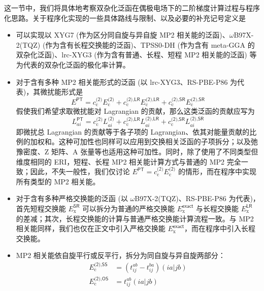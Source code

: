 这一节中，我们将具体地考察双杂化泛函在偶极电场下的二阶梯度计算过程与程序化思路。关于程序化实现的一些具体路线与限制、以及必要的补充记号定义是
\begin{itemize}[nosep]
  \item 可以实现以 XYG7 (作为区分同自旋与异自旋 MP2 相关能的泛函)、$\omega$B97X-2(TQZ) (作为含有长程交换能的泛函)、TPSS0-DH (作为含有 meta-GGA 的双杂化泛函)、lrc-XYG3 (作为含有普通、长程、短程 MP2 相关能的泛函) 等为代表的双杂化泛函的极化率计算。
  \item 对于含有多种 MP2 相关能形式的泛函 (以 lrc-XYG3、RS-PBE-P86 为代表)，其微扰能形式是
        \begin{equation*}
          E^\textsf{PT} = c_\mathrm{c}^\textsf{(2)} E_\mathrm{c}^\textsf{(2)} + c_\mathrm{c}^{\textsf{(2)}, \textsf{LR}} E_\mathrm{c}^{\textsf{(2)}, \textsf{LR}} + c_\mathrm{c}^{\textsf{(2)}, \textsf{SR}} E_\mathrm{c}^{\textsf{(2)}, \textsf{SR}}
        \end{equation*}
        假使我们希望求取微扰能对 Lagrangian 的贡献，那么这类泛函的贡献应写为
        \begin{equation*}
          L_{ai}^\textsf{PT} = c_\mathrm{c}^\textsf{(2)} L_{ai}^\textsf{(2)} + c_\mathrm{c}^{\textsf{(2)}, \textsf{LR}} L_{ai}^{\textsf{(2)}, \textsf{LR}} + c_\mathrm{c}^{\textsf{(2)}, \textsf{SR}} L_{ai}^{\textsf{(2)}, \textsf{SR}}
        \end{equation*}
        即微扰总 Lagrangian 的贡献等于各子项的 Lagrangian、依其对能量贡献的比例的加权和。这种可加性也同样可以应用到交换相关泛函的子项拆分；以及弛豫密度、Z 矩阵、A 张量等也适用这种可加性。同时，除了使用了不同类型但维度相同的 ERI，短程、长程 MP2 相关能计算方式与普通的 MP2 完全一致；因此，不失一般性，我们仅讨论 $E^\textsf{PT} = c_\mathrm{c}^\textsf{(2)} E_\mathrm{c}^\textsf{(2)}$ 的情形，而在程序中实现所有类型的 MP2 相关能。
  \item 对于含有多种严格交换能的泛函 (以 $\omega$B97X-2(TQZ)、RS-PBE-P86 为代表)，首先短程交换能 $E_\mathrm{x}^\textsf{SR}$ 可以拆分为普通的严格交换能 $E_\mathrm{x}^\textsf{exact}$ 与长程交换能 $E_\mathrm{x}^\textsf{LR}$ 的差减；其次，长程交换能的计算与普通严格交换能计算流程一致。与 MP2 相关能同样，我们也仅在正文中引入严格交换能 $E_\mathrm{x}^\textsf{exact}$，而在程序中引入长程交换能。
  \item MP2 相关能依自旋平行或反平行，拆分为同自旋与异自旋两部分：
        \begin{align}
          E_\mathrm{c}^{\textsf{(2)}, \textsf{SS}} &= (t_{ij}^{ab} - t_{ij}^{ba}) (ia|jb) \\
          E_\mathrm{c}^{\textsf{(2)}, \textsf{OS}} &= t_{ij}^{ab} (ia|jb) 

\end{align}
\end{itemize}
